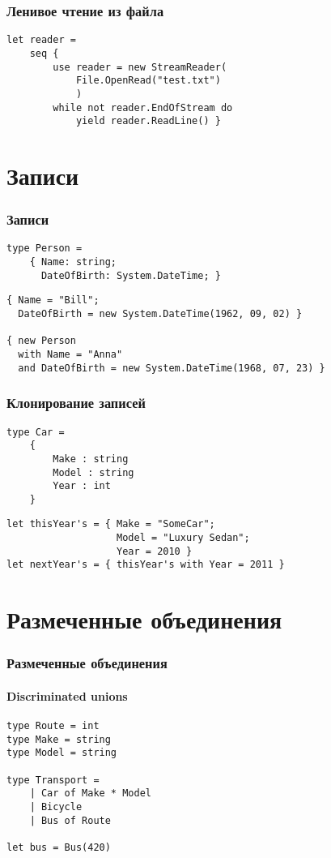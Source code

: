 \documentclass[xetex,mathserif,serif]{beamer}
\begin{document}
	\begin{frame}[fragile]
		\frametitle{Ленивое чтение из файла}
		\begin{verbatim}
let reader =
    seq { 
        use reader = new StreamReader(
            File.OpenRead("test.txt")
            )
        while not reader.EndOfStream do
            yield reader.ReadLine() }
		\end{verbatim}
	\end{frame}

	\section{Записи}
	
	\begin{frame}[fragile]
		\frametitle{Записи}
		\begin{verbatim}
type Person =
    { Name: string;
      DateOfBirth: System.DateTime; }
		\end{verbatim}

		\begin{verbatim}
{ Name = "Bill"; 
  DateOfBirth = new System.DateTime(1962, 09, 02) }

{ new Person
  with Name = "Anna"
  and DateOfBirth = new System.DateTime(1968, 07, 23) }
		\end{verbatim}
	\end{frame}

	\begin{frame}[fragile]
		\frametitle{Клонирование записей}
		\begin{verbatim}
type Car =
    {
        Make : string
        Model : string
        Year : int
    }
		\end{verbatim}
		
		\begin{verbatim}
let thisYear's = { Make = "SomeCar"; 
                   Model = "Luxury Sedan"; 
                   Year = 2010 }
let nextYear's = { thisYear's with Year = 2011 }
		\end{verbatim}
	\end{frame}

	\section{Размеченные объединения}
	
	\begin{frame}[fragile]
		\frametitle{Размеченные объединения}
		\framesubtitle{Discriminated unions}
		\begin{verbatim}
type Route = int
type Make = string
type Model = string

type Transport =
    | Car of Make * Model
    | Bicycle
    | Bus of Route

let bus = Bus(420)
		\end{verbatim}
	\end{frame}
\end{document}
